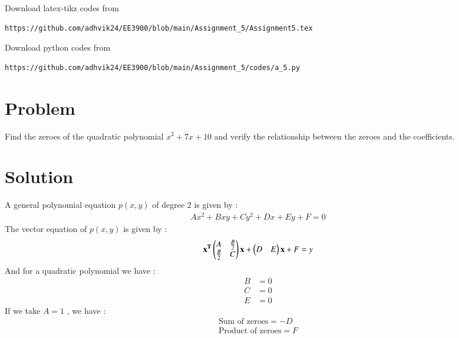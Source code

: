 \documentclass[journal,12pt,twocolumn]{IEEEtran}
\begin{document}
Download latex-tikz codes from 
%
\begin{lstlisting}
https://github.com/adhvik24/EE3900/blob/main/Assignment_5/Assignment5.tex
\end{lstlisting}
%
Download python codes from 
%
\begin{lstlisting}
https://github.com/adhvik24/EE3900/blob/main/Assignment_5/codes/a_5.py
\end{lstlisting}
\section{Problem}
Find the zeroes of the quadratic polynomial
$x^2+7x+10$ and verify the relationship between
the zeroes and the coefficients.
\section{Solution}
\begin{lemma}
A general polynomial equation $p(x,y)$ of degree 2 is given by :
\begin{align}
Ax^2 + Bxy + Cy^2 + Dx + Ey + F = 0
\end{align}
The vector equation of $p(x,y)$ is given by :
\begin{align}
\mathbf{x^T}\begin{pmatrix}A & \frac{B}{2} \\ \frac{B}{2} & C\end{pmatrix}\mathbf{x} + \begin{pmatrix}D & E\end{pmatrix}\mathbf{x} + F=y\label{eq:1}
\end{align}
And for a quadratic polynomial we have :
\begin{align}
B &= 0\\
C &= 0\\
E &= 0
\end{align}
If we take $A = 1$ , we have :
\begin{align}
\text{Sum of zeroes} = -D \\
\text{Product of zeroes} = F 
\end{align}

\end{lemma}
\end{document}
